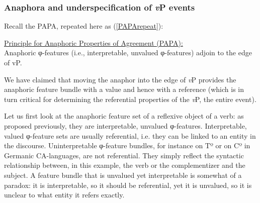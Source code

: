 \documentclass[output=paper
,modfonts
,nonflat
]{langsci/langscibook}
\begin{document}
\subsubsection{Anaphora and underspecification of \textit{v}P events}

Recall the PAPA, repeated here as (\ref{PAPArepeat}): 

\ea \label{PAPArepeat} \underline{Principle for Anaphoric Properties of Agreement  (PAPA):} \\
Anaphoric φ-features (i.e., interpretable, unvalued φ-features) adjoin to the edge of vP.
\z

We have claimed that moving the anaphor into the edge of \textit{v}P provides the anaphoric feature bundle with a value and hence with a reference (which is in turn critical for determining the referential properties of the \textit{v}P, the entire event).


Let us first look at the anaphoric feature set of a reflexive object of a verb: as proposed previously, they are interpretable, unvalued φ-features. Interpretable, valued φ-feature sets are usually referential, i.e. they can be linked to an entity in the discourse. Uninterpretable φ-feature bundles, for instance on Tº or on Cº in Germanic CA-languages, are not referential. They simply reflect the syntactic relationship between, in this example, the verb or the complementizer and the subject. A feature bundle that is unvalued yet interpretable is somewhat of a paradox: it is interpretable, so it should be referential, yet it is unvalued, so it is unclear to what entity it refers exactly. 
\end{document}
